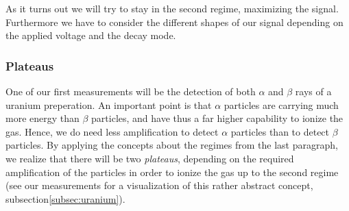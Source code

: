 As it turns out we will try to stay in the second regime, maximizing the signal. Furthermore we have to
consider the different shapes of our signal depending on the applied voltage and the decay mode.
\subsubsection{Plateaus}
\label{subsec:plateaus}
One of our first measurements will be the detection of both $\alpha$ and $\beta$ rays of a uranium preperation.
An important point is that $\alpha$ particles are carrying much more energy than $\beta$ particles, and
have thus a far higher capability to ionize the gas. Hence, we do need less amplification to detect $\alpha$
particles than to detect $\beta$ particles. By applying the concepts about the regimes from the last 
paragraph, we realize that there will be two \textit{plateaus}, depending on the required amplification of
the particles in order to ionize the gas up to the second regime (see our measurements for a visualization
of this rather abstract concept, subsection\ref{subsec:uranium}).
